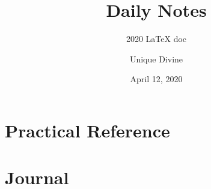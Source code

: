 \documentclass[11pt, fancy, bibstyle=apalike, cite=authoryear]{elegantbook}
\title{Daily Notes}
\subtitle{2020 \LaTeX{} doc}
\author{Unique Divine}
\institute{Elegant\LaTeX{} Program}
\date{April 12, 2020}
\begin{document}

\maketitle
\frontmatter
\tableofcontents

\mainmatter



\part{Practical Reference}





\part{Journal}




\end{document}
